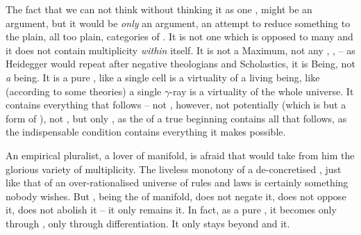 \pa The fact that we can not think  without thinking it as one
, might be an argument, but it would be {\em only} an argument, an
attempt to reduce something  to the plain, all too plain,
categories of .  It is not one which is
opposed to many and it does not contain multiplicity {\em within} itself. It is
not a Maximum, not any , ,  -- as Heidegger would repeat after negative theologians and
Scholastics, it is Being, not {\em a} being.  It is a pure , like
a single cell is a virtuality of a living being, like (according to some
theories) a single $\gamma$-ray is a virtuality of the whole universe.  It
contains everything that follows -- not , however, not potentially
(which is but a form of ), not , but only
, as the  of a true beginning contains all that
follows, as the indispensable condition contains everything it makes possible.

An empirical pluralist, a lover of manifold, is afraid that  would take
from him the glorious variety of  multiplicity.  The liveless
monotony of a de-concretised , just like that of an over-rationalised
universe of rules and laws is certainly something nobody wishes.  But ,
being the  of manifold, does not negate it, does not oppose
it, does not abolish it -- it only remains  it. In
fact, as a pure , it becomes  only through
, only through differentiation. It only stays beyond and 
it.



